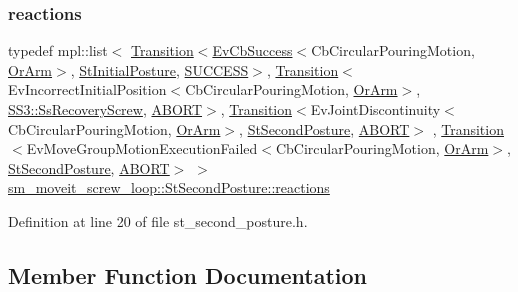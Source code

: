 \subsubsection{\texorpdfstring{reactions}{reactions}}
{\footnotesize\ttfamily typedef mpl\+::list$<$ \hyperlink{classsmacc_1_1Transition}{Transition}$<$\hyperlink{structsmacc_1_1EvCbSuccess}{Ev\+Cb\+Success}$<$Cb\+Circular\+Pouring\+Motion, \hyperlink{classsm__moveit__screw__loop_1_1OrArm}{Or\+Arm}$>$, \hyperlink{structsm__moveit__screw__loop_1_1StInitialPosture}{St\+Initial\+Posture}, \hyperlink{structsmacc_1_1default__transition__tags_1_1SUCCESS}{S\+U\+C\+C\+E\+SS}$>$, \hyperlink{classsmacc_1_1Transition}{Transition}$<$Ev\+Incorrect\+Initial\+Position$<$Cb\+Circular\+Pouring\+Motion, \hyperlink{classsm__moveit__screw__loop_1_1OrArm}{Or\+Arm}$>$, \hyperlink{structsm__moveit__screw__loop_1_1SS3_1_1SsRecoveryScrew}{S\+S3\+::\+Ss\+Recovery\+Screw}, \hyperlink{structsmacc_1_1default__transition__tags_1_1ABORT}{A\+B\+O\+RT}$>$, \hyperlink{classsmacc_1_1Transition}{Transition}$<$Ev\+Joint\+Discontinuity$<$Cb\+Circular\+Pouring\+Motion, \hyperlink{classsm__moveit__screw__loop_1_1OrArm}{Or\+Arm}$>$, \hyperlink{structsm__moveit__screw__loop_1_1StSecondPosture}{St\+Second\+Posture}, \hyperlink{structsmacc_1_1default__transition__tags_1_1ABORT}{A\+B\+O\+RT}$>$ , \hyperlink{classsmacc_1_1Transition}{Transition}$<$Ev\+Move\+Group\+Motion\+Execution\+Failed$<$Cb\+Circular\+Pouring\+Motion, \hyperlink{classsm__moveit__screw__loop_1_1OrArm}{Or\+Arm}$>$, \hyperlink{structsm__moveit__screw__loop_1_1StSecondPosture}{St\+Second\+Posture}, \hyperlink{structsmacc_1_1default__transition__tags_1_1ABORT}{A\+B\+O\+RT}$>$ $>$ \hyperlink{structsm__moveit__screw__loop_1_1StSecondPosture_a15158038b73a3eb9e9f88bf60fa87e2d}{sm\+\_\+moveit\+\_\+screw\+\_\+loop\+::\+St\+Second\+Posture\+::reactions}}



Definition at line 20 of file st\+\_\+second\+\_\+posture.\+h.



\subsection{Member Function Documentation}
\mbox{\label{structsm__moveit__screw__loop_1_1StSecondPosture_aa8f8702818aff4bba59cd992165b0d0e}} 
